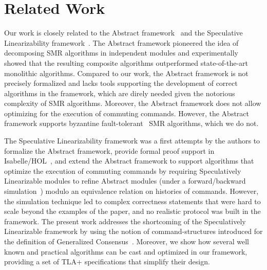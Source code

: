 \section{Related Work}
\label{sec:related}

Our work is closely related to the Abstract
framework~\cite{GuerraouiETAL10Next700BftProtocols}
and the Speculative Linearizability
framework~\cite{GuerraouiKuncakLosa12SpeculativeLinearizability}. The
Abstract framework pioneered the idea of decomposing SMR algorithms in
independent modules and experimentally showed that the resulting composite
algorithms outperformed state-of-the-art monolithic algorithms. Compared
to our work, the Abstract framework is not precisely formalized and lacks
tools supporting the development of correct algorithms in the framework,
which are direly needed given the notorious complexity of SMR algorithms.
Moreover, the Abstract framework does not allow optimizing for the execution
of commuting commands. However, the Abstract framework supports byzantine
fault-tolerant~\cite{LamportShostakPease82ByzantineGeneralsProblem} SMR
algorithms, which we do not. 

The Speculative Linearizability framework was a
first attempts by the authors to formalize the Abstract framework, provide
formal proof support in Isabelle/HOL~\cite{NipkowPaulsonWenzel02IsabelleHOL},
and extend the Abstract framework to support algorithms that optimize
the execution of commuting commands by requiring Speculatively
Linearizable modules to refine Abstract modules (under a forward/backward
simulation~\cite{LynchVaandrager95ForwardBackwardSimulationsIUntimedSystems})
modulo an equivalence relation on histories of commands. However, the simulation technique led to
complex correctness statements that were hard to scale beyond the examples of
the paper, and no realistic protocol was built in the framework. The present
work addresses the shortcoming of the Speculatively Linearizable framework by
using the notion of command-structures introduced for the definition of
Generalized Consensus~\cite{Lamport05GeneralizeConsensus}. Moreover, we show how
several well known and practical algorithms can be cast and optimized in our
framework, providing a set of TLA+ specifications that simplify their design.

